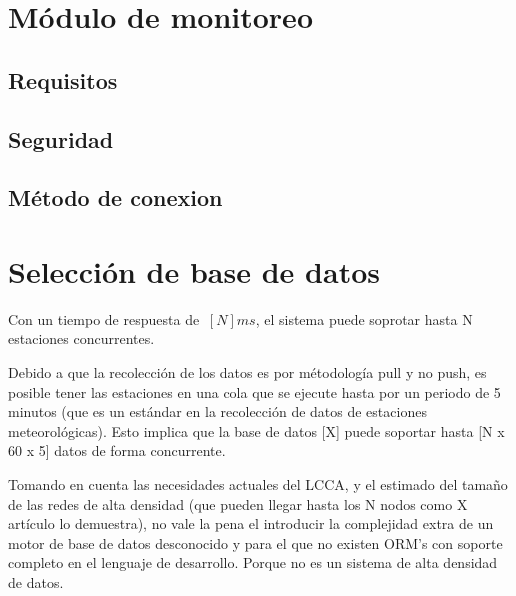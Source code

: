 \section{Módulo de monitoreo}

\subsection*{Requisitos}

\subsection*{Seguridad}

\subsection*{Método de conexion}



\section{Selección de base de datos}





Con un tiempo de respuesta de $~[N]ms$, el sistema puede soprotar hasta N estaciones concurrentes.

Debido a que la recolección de los datos es por métodología pull y no push, es posible tener las estaciones en una cola que se ejecute hasta por un periodo de 5 minutos (que es un estándar en la recolección de datos de estaciones meteorológicas). Esto implica que la base de datos [X] puede soportar hasta [N x 60 x 5] datos de forma concurrente.

Tomando en cuenta las necesidades actuales del LCCA, y el estimado del tamaño de las redes de alta densidad (que pueden llegar hasta los N nodos como X artículo lo demuestra), no vale la pena el introducir la complejidad extra de un motor de base de datos desconocido y para el que no existen ORM's con soporte completo en el lenguaje de desarrollo. Porque no es un sistema de alta densidad de datos.

